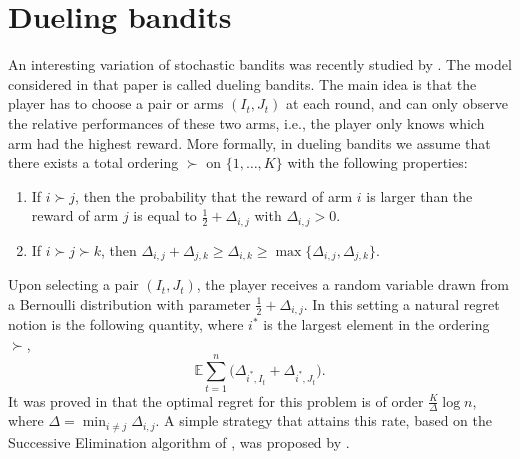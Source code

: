 \documentclass[11pt]{hackednow}
\newcommand{\E}{\mathbb{E}}
\begin{document}
\section{Dueling bandits} \label{sec:dueling}
An interesting variation of stochastic bandits was recently studied by \cite{YBKJ09}. The model considered in that paper is called dueling bandits. The main idea is that the player has to choose a pair or arms $(I_t, J_t)$ at each round, and can only observe the relative performances of these two arms, i.e., the player only knows which arm had the highest reward. More formally, in dueling bandits we assume that there exists a total ordering $\succ$ on $\{1,\hdots,K\}$ with the following properties:
\begin{enumerate}
\item If $i \succ j$, then the probability that the reward of arm $i$ is larger than the reward of arm $j$ is equal to $\frac12 + \Delta_{i,j}$ with $\Delta_{i,j} >0$.
\item If $i \succ j \succ k$, then $\Delta_{i,j} + \Delta_{j,k} \geq \Delta_{i,k} \geq \max\bigl\{\Delta_{i,j}, \Delta_{j,k}\bigr\}$.
\end{enumerate}
Upon selecting a pair $(I_t, J_t)$, the player receives a random variable drawn from a Bernoulli distribution with parameter $\frac12+\Delta_{i,j}$. In this setting a natural regret notion is the following quantity, where $i^*$ is the largest element in the ordering $\succ$,
$$\E \sum_{t=1}^n \bigl(\Delta_{i^*, I_t} + \Delta_{i^*, J_t} \bigr) .$$
It was proved in \cite{YBKJ09} that the optimal regret for this problem is of order $\frac{K}{\Delta} \log n$, where $\Delta = \min_{i \neq j} \Delta_{i,j}$. A simple strategy that attains this rate, based on the Successive Elimination algorithm of \cite{EMM02}, was proposed by \cite{YJ11}.
\end{document}
